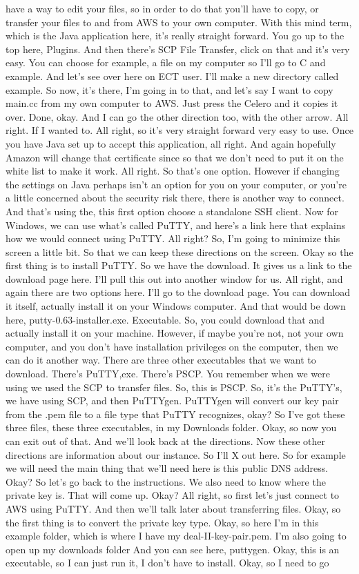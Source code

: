 \documentclass[10pt]{article}
\begin{document}
have a way to edit your files, so in order to do that you'll have to copy, or transfer your files to and from AWS to your own computer. With this mind term, which is the Java application here, it's really straight forward. You go up to the top here, Plugins. And then there's SCP File Transfer, click on that and it's very easy. You can choose for example, a file on my computer so I'll go to C and example. And let's see over here on ECT user. I'll make a new directory called example. So now, it's there, I'm going in to that, and let's say I want to copy main.cc from my own computer to AWS. Just press the Celero and it copies it over. Done, okay. And I can go the other direction too, with the other arrow. All right. If I wanted to. All right, so it's very straight forward very easy to use. Once you have Java set up to accept this application, all right. And again hopefully Amazon will change that certificate since so that we don't need to put it on the white list to make it work. All right. So that's one option. However if changing the settings on Java perhaps isn't an option for you on your computer, or you're a little concerned about the security risk there, there is another way to connect. And that's using the, this first option choose a standalone SSH client. Now for Windows, we can use what's called PuTTY, and here's a link here that explains how we would connect using PuTTY. All right? So, I'm going to minimize this screen a little bit. So that we can keep these directions on the screen. Okay so the first thing is to install PuTTY. So we have the download. It gives us a link to the download page here. I'll pull this out into another window for us. All right, and again there are two options here. I'll go to the download page. You can download it itself, actually install it on your Windows computer. And that would be down here, putty-0.63-installer.exe. Executable. So, you could download that and actually install it on your machine. However, if maybe you're not, not your own computer, and you don't have installation privileges on the computer, then we can do it another way. There are three other executables that we want to download. There's PuTTY,exe. There's PSCP. You remember when we were using we used the SCP to transfer files. So, this is PSCP. So, it's the PuTTY's, we have using SCP, and then PuTTYgen. PuTTYgen will convert our key pair from the .pem file to a file type that PuTTY recognizes, okay? So I've got these three files, these three executables, in my Downloads folder. Okay, so now you can exit out of that. And we'll look back at the directions. Now these other directions are information about our instance. So I'll X out here. So for example we will need the main thing that we'll need here is this public DNS address. Okay? So let's go back to the instructions. We also need to know where the private key is. That will come up. Okay? All right, so first let's just connect to AWS using PuTTY. And then we'll talk later about transferring files. Okay, so the first thing is to convert the private key type. Okay, so here I'm in this example folder, which is where I have my deal-II-key-pair.pem. I'm also going to open up my downloads folder And you can see here, puttygen. Okay, this is an executable, so I can just run it, I don't have to install. Okay, so I need to go 
\end{document}
